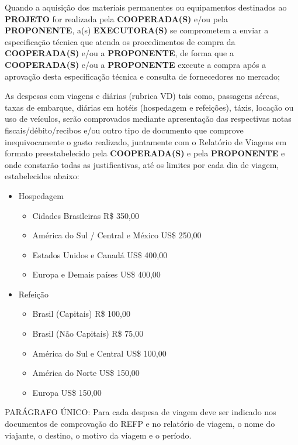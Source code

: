 \xxxx Quando a aquisição dos materiais permanentes ou equipamentos destinados ao \textbf{PROJETO} for realizada pela \textbf{COOPERADA(S)} e/ou pela \textbf{PROPONENTE}, a(s) \textbf{EXECUTORA(S)} se comprometem a enviar a especificação técnica que atenda os procedimentos de compra da \textbf{COOPERADA(S)} e/ou a \textbf{PROPONENTE}, de forma que a \textbf{COOPERADA(S)} e/ou a \textbf{PROPONENTE} execute a compra após a aprovação desta especificação técnica e consulta de fornecedores no mercado;

\xxx As despesas com viagens e diárias (rubrica VD) tais como, passagens aéreas, taxas de embarque, diárias em hotéis (hospedagem e refeições), táxis, locação ou uso de veículos, serão comprovados mediante apresentação das respectivas notas fiscais/débito/recibos e/ou outro tipo de documento que comprove inequivocamente o gasto realizado, juntamente com o Relatório de Viagens em formato preestabelecido pela \textbf{COOPERADA(S)} e pela \textbf{PROPONENTE} e onde constarão todas as justificativas, até os limites por cada dia de viagem, estabelecidos abaixo:


\begin{itemize}[leftmargin=3cm]
    \item Hospedagem
          \begin{itemize}
              \item Cidades Brasileiras R\$ 350,00
              \item América do Sul / Central e México US\$ 250,00
              \item Estados Unidos e Canadá US\$ 400,00
              \item Europa e Demais países US\$ 400,00
          \end{itemize}
    \item Refeição
          \begin{itemize}
              \item Brasil (Capitais) R\$ 100,00
              \item Brasil (Não Capitais) R\$ 75,00
              \item América do Sul e Central US\$ 100,00
              \item América do Norte US\$ 150,00
              \item Europa US\$ 150,00
          \end{itemize}
\end{itemize}

PARÁGRAFO ÚNICO: Para cada despesa de viagem deve ser indicado nos documentos de comprovação do REFP e no relatório de viagem, o nome do viajante, o destino, o motivo da viagem e o período.

